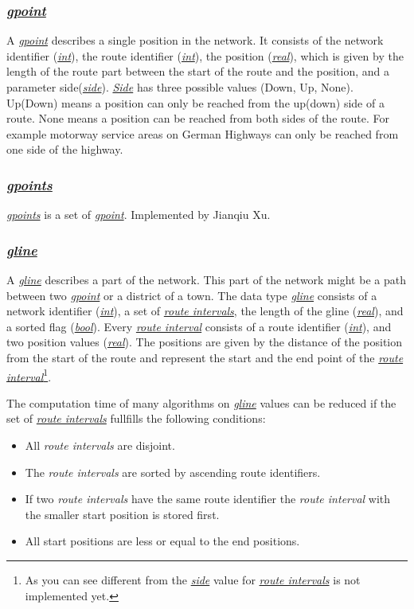 \documentclass[a4paper]{article}
\newcommand{\var}[1]{\textsl{#1}}
\newcommand{\dt}[1]{\textsl{\underline{#1}}}
\begin{document}
\subsubsection {\dt{gpoint}}
A \dt{gpoint} describes a single position in the network. It consists of the network identifier (\dt{int}), the route identifier (\dt{int}), the position (\dt{real}), which is given by the length of the route part between the start of the route and the position, and a parameter side(\dt{side}). \dt{Side} has three possible values (Down, Up, None). Up(Down) means a position can only be reached from the up(down) side of a route. None means a position can be reached from both sides of the route. For example motorway service areas on German Highways can only be reached from one side of the highway.
\subsubsection{\dt{gpoints}}
\dt{gpoints} is a set of \dt{gpoint}. Implemented by Jianqiu Xu.
\subsubsection{\dt{gline}}
A \dt{gline} describes a part of the network. This part of the network might be a path between two \dt{gpoint} or a district of a town. The data type \dt{gline} consists of a network identifier (\dt{int}), a set of \dt{route intervals}, the length of the gline (\dt{real}), and a sorted flag (\dt{bool}). Every \dt{route interval} consists of a route identifier (\dt{int}), and two position values (\dt{real}). The positions are given by the distance of the position from the start of the route and represent the start and the end point of the \dt{route interval}\footnote{As you can see different from \cite{1146465} the \dt{side} value for \dt{route intervals} is not implemented yet.}.

The computation time of many algorithms on \dt{gline} values can be reduced if the set of \dt{route intervals} fullfills the following conditions:\label{sec:sortedgline}
\begin{itemize}
\item All \var{route intervals} are disjoint.
\item The \var{route intervals} are sorted by ascending route identifiers.
\item If two \var{route intervals} have the same route identifier the \var{route interval} with the smaller start position is stored first.
\item All start positions are less or equal to the end positions.
\end{itemize}
\end{document}
